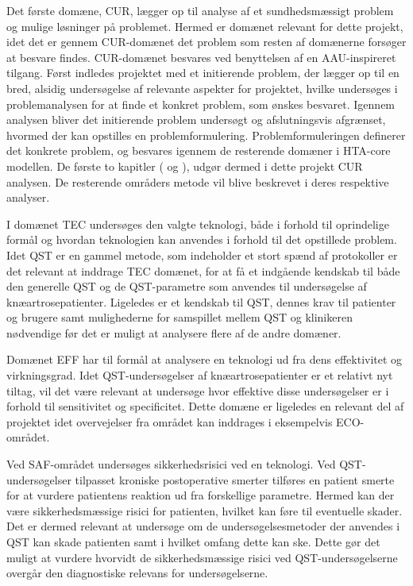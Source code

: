 Det første domæne, CUR, lægger op til analyse af et sundhedsmæssigt problem og mulige løsninger på problemet. Hermed er domænet relevant for dette projekt, idet det er gennem CUR-domænet det problem som resten af domænerne forsøger at besvare findes. CUR-domænet besvares ved benyttelsen af en AAU-inspireret tilgang. Først indledes projektet med et initierende problem, der lægger op til en bred, alsidig undersøgelse af relevante aspekter for projektet, hvilke undersøges i problemanalysen for at finde et konkret problem, som ønskes besvaret. Igennem analysen bliver det initierende problem undersøgt og afslutningsvis afgrænset, hvormed der kan opstilles en problemformulering. Problemformuleringen definerer det konkrete problem, og besvares igennem de resterende domæner i HTA-core modellen. De første to kapitler ( og ), udgør dermed i dette projekt CUR analysen. De resterende områders metode vil blive beskrevet i deres respektive analyser. 


I domænet TEC undersøges den valgte teknologi, både i forhold til oprindelige formål og hvordan teknologien kan anvendes i forhold til det opstillede problem. Idet QST er en gammel metode, som indeholder et stort spænd af protokoller er det relevant at inddrage TEC domænet, for at få et indgående kendskab til både den generelle QST og de QST-parametre som anvendes til undersøgelse af knæartrosepatienter. Ligeledes er et kendskab til QST, dennes krav til patienter og brugere samt mulighederne for samspillet mellem QST og klinikeren nødvendige før det er muligt at analysere flere af de andre domæner. 


Domænet EFF har til formål at analysere en teknologi ud fra dens effektivitet og virkningsgrad. Idet QST-undersøgelser af knæartrosepatienter er et relativt nyt tiltag, vil det være relevant at undersøge hvor effektive disse undersøgelser er i forhold til sensitivitet og specificitet. Dette domæne er ligeledes en relevant del af projektet idet overvejelser fra området kan inddrages i eksempelvis ECO-området.   


Ved SAF-området undersøges sikkerhedsrisici ved en teknologi. Ved QST-undersøgelser tilpasset kroniske postoperative smerter tilføres en patient smerte for at vurdere patientens reaktion ud fra forskellige parametre. Hermed kan der være sikkerhedsmæssige risici for patienten, hvilket kan føre til eventuelle skader. Det er dermed relevant at undersøge om de undersøgelsesmetoder der anvendes i QST kan skade patienten samt i hvilket omfang dette kan ske. Dette gør det muligt at vurdere hvorvidt de sikkerhedsmæssige risici ved QST-undersøgelserne overgår den diagnostiske relevans for undersøgelserne. 


